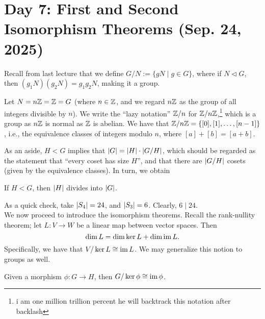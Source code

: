 \section{Day 7: First and Second Isomorphism Theorems (Sep. 24, 2025)}
Recall from last lecture that we define $G/N := \{gN \mid g \in G\}$, where if $N \lhd G$, then $(g_1N)(g_2N) = g_1g_2N$, making it a group.
\begin{example}
    Let $N = n\mathbb Z = \mathbb Z = G$ (where $n \in \mathbb Z$, and we regard $n\mathbb Z$ as the group of all integers divisible by $n$). We write the ``lazy notation'' $\mathbb Z/n$ for $\mathbb Z/n\mathbb Z$,\footnote{i am one million trillion percent he will backtrack this notation after backlash} which is a group as $n\mathbb Z$ is normal as $\mathbb Z$ is abelian. We have that $\mathbb Z/n\mathbb Z = \{[0], [1], \dots, [n-1]\}$, i.e., the equivalence classes of integers modulo $n$, where $[a] + [b] = [a + b]$.
\end{example}
\noindent As an aside, $H < G$ implies that $\left\lvert G \right\rvert = \left\lvert H \right\rvert \cdot \left\lvert G/H \right\rvert$, which should be regarded as the statement that ``every coset has size $H$'', and that there are $\left\lvert G/H \right\rvert$ cosets (given by the equivalence classes). In turn, we obtain
\begin{theorem}
    If $H < G$, then $\left\lvert H \right\rvert$ divides into $\left\lvert G \right\rvert$.
\end{theorem}
\noindent As a quick check, take $\left\lvert S_4 \right\rvert = 24$, and $\left\lvert S_3 \right\rvert = 6$. Clearly, $6 \mid 24$.
\\[8pt]
We now proceed to introduce the isomorphism theorems. Recall the rank-nullity theorem; let $L : V \to W$ be a linear map between vector spaces. Then
\[ \dim L = \dim \ker L + \dim \operatorname{im} L. \]
Specifically, we have that $V/\ker L \cong \operatorname{im} L$. We may generalize this notion to groups as well.
\begin{theorem}
    Given a morphism $\phi : G \to H$, then $G/\ker \phi \cong \operatorname{im} \phi$.
\end{theorem}
